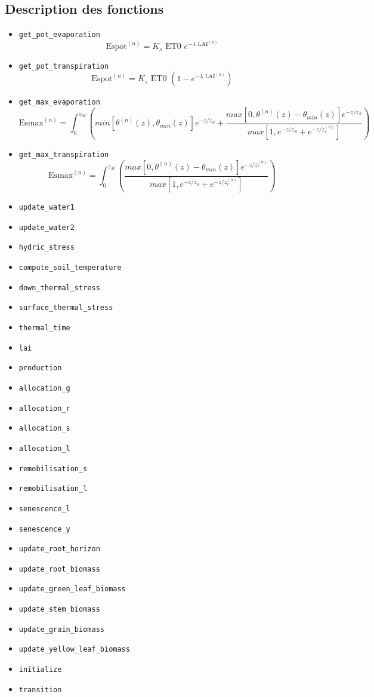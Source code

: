 \subsection{Description des fonctions}

\begin{itemize}
\renewcommand{\labelitemi}{$\bullet$}
\item \texttt{get_pot_evaporation       }
  \[
    \text{Espot}^{(n)} = K_s \text{ ET0 } e^{-\lambda \text{ LAI}^{(n)}}
  \]
\item \texttt{get_pot_transpiration     }
  \[
    \text{Espot}^{(n)} = K_s \text{ ET0 } (1 - e^{-\lambda \text{ LAI}^{(n)}})
  \]
\item \texttt{get_max_evaporation       }
  \[
    \text{Esmax}^{(n)} = \int_0^{z_M} \left(min[\theta^{(n)}(z),
    \theta_{min}(z)]e^{-z/z_S} + \frac{max[0,\theta^{(n)}(z)
    - \theta_{min}(z)]e^{-z/z_S}}{max[1,e^{-z/z_S}
    + e^{-z/z_r^{(n)}}]}\right)
  \]
\item \texttt{get_max_transpiration     }
  \[
    \text{Esmax}^{(n)} = \int_0^{z_M} \left(
    \frac{max[0,\theta^{(n)}(z)
    - \theta_{min}(z)]e^{-z/z_r^{(n)}}}{max[1,e^{-z/z_S}
    + e^{-z/z_r^{(n)}}]}\right)
  \]
\item \texttt{update_water1             }
\item \texttt{update_water2             }
\item \texttt{hydric_stress             }
\item \texttt{compute_soil_temperature  }
\item \texttt{down_thermal_stress       }
\item \texttt{surface_thermal_stress    }
\item \texttt{thermal_time              }
\item \texttt{lai                       }
\item \texttt{production                }
\item \texttt{allocation_g              }
\item \texttt{allocation_r              }
\item \texttt{allocation_s              }
\item \texttt{allocation_l              }
\item \texttt{remobilisation_s          }
\item \texttt{remobilisation_l          }
\item \texttt{senescence_l              }
\item \texttt{senescence_y              }
\item \texttt{update_root_horizon       }
\item \texttt{update_root_biomass       }
\item \texttt{update_green_leaf_biomass }
\item \texttt{update_stem_biomass       }
\item \texttt{update_grain_biomass      }
\item \texttt{update_yellow_leaf_biomass}
\item \texttt{initialize                }
\item \texttt{transition                }
\end{itemize}